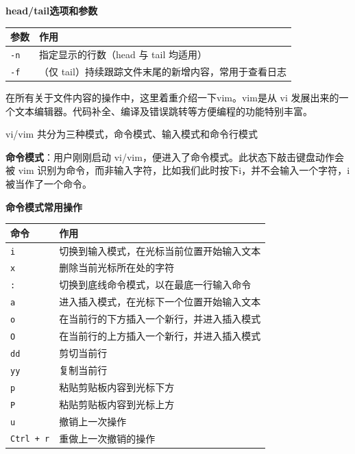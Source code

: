 \begin{table}[H]\centering
\textbf{head/tail\enspace 选项和参数}

	\begin{tabular}{p{}p{}}
		\toprule[1.5pt]
		参数 & 作用\\
		\midrule[1pt]
		\texttt{-n}\enspace [行数] 		&指定显示的行数（head 与 tail 均适用）\\
		\texttt{-f}		&（仅 tail）持续跟踪文件末尾的新增内容，常用于查看日志\\
		\bottomrule[1.5pt]
	\end{tabular}
\end{table}


在所有关于文件内容的操作中，这里着重介绍一下vim。vim是从 vi 发展出来的一个文本编辑器。代码补全、编译及错误跳转等方便编程的功能特别丰富。

vi/vim 共分为三种模式，命令模式、输入模式和命令行模式

\textbf{命令模式}：用户刚刚启动 vi/vim，便进入了命令模式。此状态下敲击键盘动作会被 vim 识别为命令，而非输入字符，比如我们此时按下i，并不会输入一个字符，i被当作了一个命令。


\begin{table}[H]\centering
\textbf{命令模式常用操作}

	\begin{tabular}{p{}p{}}
		\toprule[1.5pt]
		命令 & 作用\\
		\midrule[1pt]
		\texttt{i}		&切换到输入模式，在光标当前位置开始输入文本\\
		\texttt{x}		&删除当前光标所在处的字符\\
		\texttt{:}		&切换到底线命令模式，以在最底一行输入命令\\
		\texttt{a}		&进入插入模式，在光标下一个位置开始输入文本\\
		\texttt{o}		&在当前行的下方插入一个新行，并进入插入模式\\
		\texttt{O}		&在当前行的上方插入一个新行，并进入插入模式\\
		\texttt{dd}		&剪切当前行\\
		\texttt{yy}		&复制当前行\\
		\texttt{p}		&粘贴剪贴板内容到光标下方\\
		\texttt{P}		&粘贴剪贴板内容到光标上方\\
		\texttt{u}		&撤销上一次操作\\
		\texttt{Ctrl + r}		&重做上一次撤销的操作\\
		\bottomrule[1.5pt]
	\end{tabular}
\end{table}


